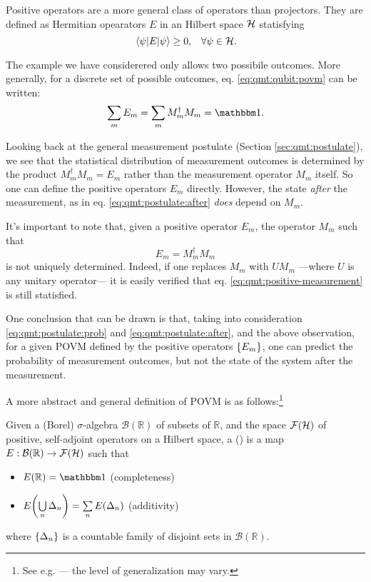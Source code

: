 Positive operators are a more general class of operators than projectors.
They are defined as Hermitian opearators $E$ in an Hilbert space $\mathcal{H}$ statisfying
\[
  \ev{E}{\psi} \ge 0 \text{,}\quad \forall \psi \in \hilb{H}.
\]

The example we have considerered only allows two possibile outcomes.
More generally, for a discrete set of possible outcomes, 
eq. \eqref{eq:qmt:qubit:povm} can be written:
\begin{equation}
  \sum_m E_m = \sum_m M_m^{\dagger} M_m = \idop \text{.}
\end{equation}

Looking back at the general measurement postulate (Section \ref{sec:qmt:postulate}),
we see that the statistical distribution of measurement outcomes
is determined by the product $M_m^{\dagger} M_m = E_m$ rather than the
measurement operator $M_m$ itself. So one can define the positive operators $E_m$ directly.
However, the state \emph{after} the measurement, as in eq. \eqref{eq:qmt:postulate:after}
\emph{does} depend on $M_m$.

It's important to note that, given a positive operator $E_m$, the operator
$M_m$ such that
\begin{equation}\label{eq:qmt:positive-measurement}
  E_m = M_{m}^{\dagger} M_m
\end{equation}
is not uniquely determined. 
Indeed, if one replaces $M_m$ with $UM_m$
---where $U$ is any unitary operator---
it is easily verified that
eq. \eqref{eq:qmt:positive-measurement} is still statisfied.

One conclusion that can be drawn is that,
taking into consideration \eqref{eq:qmt:postulate:prob} and
\eqref{eq:qmt:postulate:after}, and the above observation,
for a  given POVM defined by the positive operators $\left\{E_m\right\}$,
one can predict the probability of measurement outcomes,
but not the state of the system after the measurement.

A more abstract and general definition of POVM is as
follows:\footnote{
  See e.g. \cite{BeneduciPhD, Berberian} --- the level of generalization may vary.
}
\begin{definition}
  Given a (Borel) $\sigma$-algebra $\mathcal{B}(\mathbb{R})$ of subsets of $\mathbb{R}$,
  and the space $\mathcal{F}(\mathcal{H})$ of positive, self-adjoint operators on a Hilbert space,
  a  ()
  is a map $E: \mathcal{B}(\mathbb{R}) \rightarrow \mathcal{F}(\mathcal{H})$
  such that
  \begin{itemize}
    \item $E(\mathbb{R}) = \idop$ (completeness)
    \item $E\qty(\bigcup\limits_{n} \Delta_n) = \sum\limits_{n} E\qty(\Delta_n)$ (additivity) 
  \end{itemize}
  where $\left\{\Delta_n\right\}$ is a countable family of disjoint sets in
  $\mathcal{B}(\mathbb{R})$.
\end{definition}
